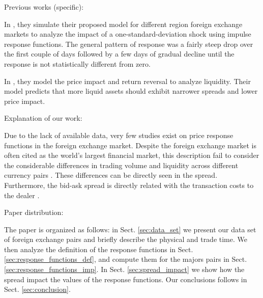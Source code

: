 Previous works (specific):

In \cite{forex_volatility}, they simulate their proposed model for different
region foreign exchange markets to analyze the
impact of a one-standard-deviation shock using impulse response functions. The
general pattern of response was a fairly steep drop over the first couple of
days followed by a few days of gradual decline until the response is not
statistically different from zero.

In \cite{forex_liquidity}, they model the price impact and return reversal to
analyze liquidity. Their model predicts that more liquid assets should exhibit
narrower spreads and lower price impact.




Explanation of our work:

Due to the lack of available data, very few studies exist on price response functions in the foreign exchange
market.
Despite the foreign exchange market is often cited as the world's largest financial
market, this description fail to consider the considerable differences in trading
volume and liquidity across different currency pairs \cite{forex_microstructure}. These differences can be
directly seen in the spread. Furthermore, the bid-ask spread is directly related
with the transaction costs to the dealer \cite{teach_spread,spread_futures}.




Paper distribution:

The paper is organized as follows: in Sect. \ref{sec:data_set} we present our
data set of foreign exchange pairs and briefly describe the physical and trade time. We then
analyze the definition of the response functions in Sect.
\ref{sec:response_functions_def}, and compute them for the majors pairs in
Sect. \ref{sec:response_functions_imp}.
In Sect. \ref{sec:spread_impact} we show how the spread impact the values of the
response functions. Our conclusions follows in Sect. \ref{sec:conclusion}.